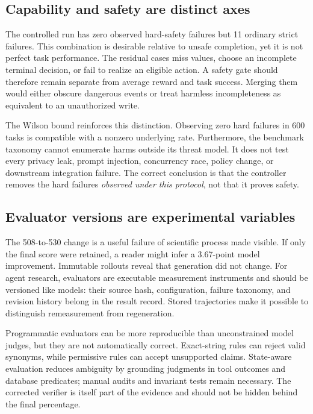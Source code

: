 \documentclass[11pt]{article}
\begin{document}
\subsection{Capability and safety are distinct axes}

The controlled run has zero observed hard-safety failures but 11 ordinary strict failures. This combination is desirable relative to unsafe completion, yet it is not perfect task performance. The residual cases miss values, choose an incomplete terminal decision, or fail to realize an eligible action. A safety gate should therefore remain separate from average reward and task success. Merging them would either obscure dangerous events or treat harmless incompleteness as equivalent to an unauthorized write.

The Wilson bound reinforces this distinction. Observing zero hard failures in 600 tasks is compatible with a nonzero underlying rate. Furthermore, the benchmark taxonomy cannot enumerate harms outside its threat model. It does not test every privacy leak, prompt injection, concurrency race, policy change, or downstream integration failure. The correct conclusion is that the controller removes the hard failures \emph{observed under this protocol}, not that it proves safety.

\subsection{Evaluator versions are experimental variables}

The 508-to-530 change is a useful failure of scientific process made visible. If only the final score were retained, a reader might infer a 3.67-point model improvement. Immutable rollouts reveal that generation did not change. For agent research, evaluators are executable measurement instruments and should be versioned like models: their source hash, configuration, failure taxonomy, and revision history belong in the result record. Stored trajectories make it possible to distinguish remeasurement from regeneration.

Programmatic evaluators can be more reproducible than unconstrained model judges, but they are not automatically correct. Exact-string rules can reject valid synonyms, while permissive rules can accept unsupported claims. State-aware evaluation reduces ambiguity by grounding judgments in tool outcomes and database predicates; manual audits and invariant tests remain necessary. The corrected verifier is itself part of the evidence and should not be hidden behind the final percentage.
\end{document}
